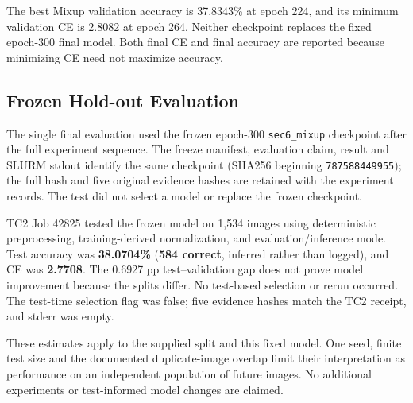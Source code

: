 \documentclass[letterpaper]{article}
\begin{document}
\begin{samepage}
The best Mixup validation accuracy is 37.8343\% at epoch 224, and its minimum
validation CE is 2.8082 at epoch 264. Neither checkpoint replaces the fixed
epoch-300 final model. Both final CE and final accuracy are reported because
minimizing CE need not maximize accuracy.\par
\end{samepage}

\subsection{Frozen Hold-out Evaluation}
The single final evaluation used the frozen epoch-300
\texttt{sec6\_mixup} checkpoint after the full experiment sequence. The freeze
manifest, evaluation claim, result and SLURM stdout identify the same checkpoint
(SHA256 beginning \texttt{787588449955}); the full hash and five original
evidence hashes are retained with the experiment records. The test did not
select a model or replace the frozen checkpoint.

TC2 Job 42825 tested the frozen model on 1,534 images using deterministic
preprocessing, training-derived normalization, and evaluation/inference mode.
Test accuracy was \textbf{38.0704\%} (\textbf{584 correct}, inferred rather than
logged), and CE was \textbf{2.7708}. The 0.6927 pp test--validation gap does not
prove model improvement because the splits differ. No test-based selection or
rerun occurred. The test-time selection flag was false; five evidence hashes
match the TC2 receipt, and stderr was empty.

These estimates apply to the supplied split and this fixed model. One seed,
finite test size and the documented duplicate-image overlap limit their
interpretation as performance on an independent population of future images.
No additional experiments or test-informed model changes are claimed.

\label{bodyend}

\end{document}

